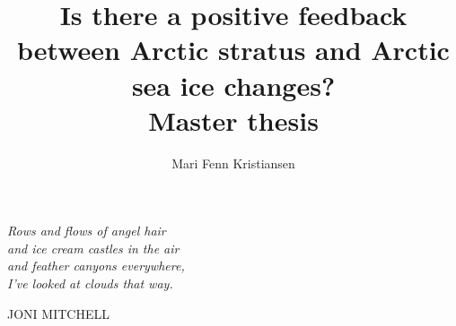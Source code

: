 \documentclass[11pt, a4paper]{book}
\newcommand{\boxcolor}{Blue}
\renewcommand{\textcolor}{White}
\begin{document}
\title{Is there a positive feedback between Arctic stratus and Arctic sea ice changes?\\Master thesis}
\author{Mari Fenn Kristiansen}
\date{}

 \uiosloforside[kind=Master thesis in Geosciences Meteorology and oceanography, dept=Department of Geosciences, boxcolor=\boxcolor, textcolor=\textcolor, date=1st June 2015] 
 
\newlength\longest
\clearpage

\thispagestyle{empty}
\null\vfill

\settowidth{}
{\centering
\parbox{\longest}{%
  \raggedright{\huge\itshape%
   Rows and flows of angel hair \\ 
  and ice cream castles in the air \\
  and feather canyons everywhere, \\ 
  I've looked at clouds that way.\par\bigskip
  }   
  \raggedleft\Large\MakeUppercase{Joni Mitchell}\par%
}}

\vfill\vfill

\clearpage



\tableofcontents




\end{document}
